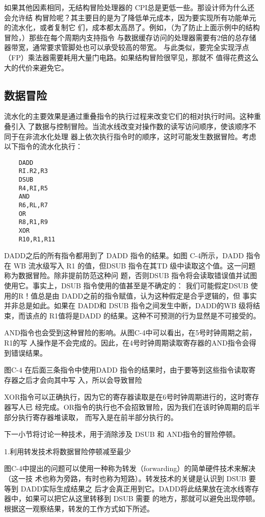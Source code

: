 如果其他因素相同，无结构冒险处理器的 CPI总是更低一些。那设计师为什么还会允许结
构冒险呢？其主要目的是为了降低单元成本，因为要实现所有功能单元的流水化，或者复制它
们，成本都太高昂了。例如，（为了防止上面示例中的结构冒险，）那些在每个周期内支持指令
与数据缓存访问的处理器需要有2倍的总存储器带宽，通常要求管脚处也可以承受较高的带宽。
与此类似，要完全实现浮点（FP）乘法器需要耗用大量门电路。如果结构冒险很罕见，那就不
值得花费这么大的代价来避免它。

\subsection{数据冒险}

流水化的主要效果是通过重叠指令的执行过程来改变它们的相对执行时间。这种重叠引入
了数据与控制冒险。当流水线改变对操作数的读写访问顺序，使该顺序不同于在非流水化处理
器上依次执行指令时的顺序，这时可能发生数据冒险。考虑以下指令的流水化执行：

\begin{verbatim}
    DADD
    RI.R2,R3
    DSUB
    R4,RI,R5
    AND
    R6,RL,R7
    OR
    R8,R1,R9
    XOR
    R10,R1,R11
\end{verbatim}

DADD之后的所有指令都用到了 DADD 指令的结果。如图 C-4所示，DADD 指令在 WB 流水级写入
R1 的值，但DSUB 指令在其TD 级中读取这个值。这一问题称为数据冒险。除非提前防范这种问
题，否则DSUB 指令将会读取错误值并试图使用它。事实上，DSUB 指令使用的值甚至是不确定的：
我们可能假定DSUB 使用的R！值总是由 DADD之前的指令赋值，认为这种假定是合乎逻辑的，但
事实并非总是如此。如果在 DADD和 DSUB 指令之间发生中断，DADD的WB 级将结束，而该点的
R1值将是DADD 的结果。这种不可预测的行为显然是不可接受的。

AND指令也会受到这种冒险的影响。从图C-4中可以看出，在5号时钟周期之前，R1的写
人操作是不会完成的。因此，在4号时钟周期读取寄存器的AND指令会得到错误结果。

图C-4 在后面三条指令中使用DADD 指令的结果时，由于要等到这些指令读取寄存器之后才会向其中写
入，所以会导致冒险

XOR指令可以正确执行，因为它的寄存器读取是在6号时钟周期进行的，这时寄存器写人已
经完成。OR指令的执行也不会招致冒险，因为我们在该时钟周期的后半部分执行寄存器堆读取，
而写入是在前半部分执行的。

下一小节将讨论一种技术，用于消除涉及 DSUB 和 AND指令的冒险停顿。

1.利用转发技术将数据冒险停顿减至最少

图C-4中提出的问题可以使用一种称为转发（forwarding）的简单硬件技术来解决（这一技
术也称为旁路，有时也称为短路）。转发技术的关键是认识到 DSUB 要等到 DADD实际生成结果之
后才会真正用到它。DADD将此结果放在流水线寄存器中，如果可以把它从这里转移到 DSUB 需要
的地方，那就可以避免出现停顿。根据这一观察结果，转发的工作方式如下所述。

